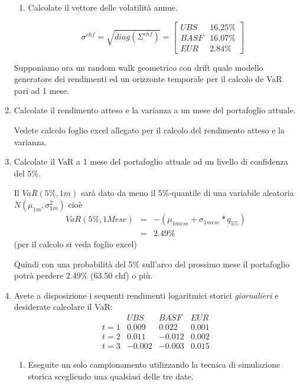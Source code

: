 \documentclass[a4paper,12pt]{article}
\begin{document}
\begin{enumerate}
\begin{enumerate}
\item  Calcolate il vettore delle volatilit\`{a} annue.

\[
\sigma ^{chf}=\sqrt{diag(\Sigma ^{chf})}=\left[ 
\begin{array}{cc}
UBS & 16.25\% \\ 
BASF & 16.07\% \\ 
EUR & 2.84\%
\end{array}
\right] 
\]
\end{enumerate}

Supponiamo ora un random walk geometrico con drift quale modello generatore
dei rendimenti ed un orizzonte temporale per il calcolo de VaR pari ad 1
mese.

\item  Calcolate il rendimento atteso e la varianza a un mese del
portafoglio attuale.

Vedete calcolo foglio excel allegato per il calcolo del rendimento atteso e
la varianza.

\item  Calcolate il VaR a 1 mese del portafoglio attuale ad un livello di
confidenza del $5\%$.

Il $VaR(5\%,1m)$ sar\`{a} dato da meno il 5\%-quantile di una variabile
aleatoria $N(\mu _{1m},\sigma _{1m}^{2})$ cio\`{e}
\begin{eqnarray*}
VaR(5\%,1Mese) &=&-\left( \mu _{1mese}+\sigma _{1mese}\ast q_{5\%}\right)  \\
&=&2.49\% 
\end{eqnarray*}
(per il calcolo si veda foglio excel)

Quindi con una probabilit\`a del 5\% sull'arco del prossimo mese il portafoglio potr\`a
perdere 2.49\% (63.50 chf) o pi\`u. 
\item  Avete a disposizione i sequenti rendimenti logaritmici storici \emph{%
giornalieri} e desiderate calcolare il VaR:
\[
\begin{array}{cccc}
& UBS & BASF & EUR \\ 
t=1 & 0.009 & 0.022 & 0.001 \\ 
t=2 & 0.011 & -0.012 & 0.002 \\ 
t=3 & -0.002 & -0.003 & 0.015
\end{array}
\]

\begin{enumerate}
\item  Eseguite un solo campionamento utilizzando la tecnica di simulazione
storica scegliendo una qualsiasi delle tre date.


\end{enumerate}
\end{enumerate}
\end{document}
